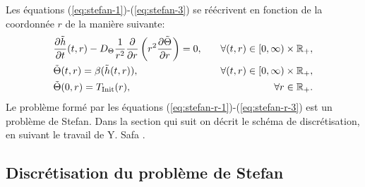 Les équations (\ref{eq:stefan-1})-(\ref{eq:stefan-3}) se réécrivent en
fonction de la coordonnée $r$ de la manière suivante:
\begin{align}
  &\frac{\partial\tilde{h}}{\partial t}(t, r) -
  D_\Theta \frac{1}{r^2}\frac{\partial}{\partial
    r}\left( r^2\frac{\partial \tilde{\Theta}}{\partial r} \right) = 0, &\quad
  \forall (t, r)\in [0, \infty)\times \mathbb R_+,\label{eq:stefan-r-1}\\
    &\tilde{\Theta}(t, r) = \beta(\tilde{h}(t, r)), &\quad
    \forall (t, r)\in [0, \infty)\times \mathbb R_+,\label{eq:stefan-r-2}\\
      &\tilde{\Theta}(0, r) = T_\text{Init}(r),&\quad \forall r \in \mathbb R_+.\label{eq:stefan-r-3}
\end{align}
Le problème formé par les équations
(\ref{eq:stefan-r-1})-(\ref{eq:stefan-r-3}) est un problème de
Stefan. Dans la section qui suit on décrit le schéma de
discrétisation, en suivant le travail de Y. Safa \cite{Safa2009}.

\subsection*{Discrétisation du problème de Stefan}

